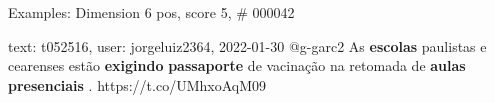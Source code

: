 \begin{frame}{Examples: Dimension 6 pos, score 5, \# 000042}
\footnotesize
\begin{exampleblock}{text: t052516, user: jorgeluiz2364, 2022-01-30}
@g-garc2 As \textbf{escolas} paulistas e cearenses estão \textbf{exigindo} 
\textbf{passaporte} de vacinação na retomada de \textbf{aulas} 
\textbf{presenciais} . https://t.co/UMhxoAqM09 
\end{exampleblock}
\end{frame}
